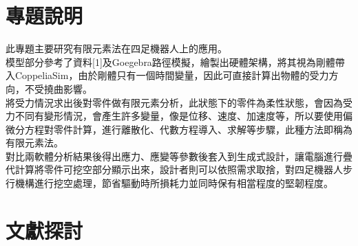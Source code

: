 \section{專題說明}
此專題主要研究有限元素法在四足機器人上的應用。\\
模型部分參考了資料[1]及Goegebra路徑模擬，繪製出硬體架構，將其視為剛體帶入CoppeliaSim，由於剛體只有一個時間變量，因此可直接計算出物體的受力方向，不受撓曲影響。\\
將受力情況求出後對零件做有限元素分析，此狀態下的零件為柔性狀態，會因為受力不同有變形情況，會產生許多變量，像是位移、速度、加速度等，所以要使用偏微分方程對零件計算，進行離散化、代數方程導入、求解等步驟，此種方法即稱為有限元素法。\\
對比兩軟體分析結果後得出應力、應變等參數後套入到生成式設計，讓電腦進行疊代計算將零件可挖空部分顯示出來，設計者則可以依照需求取捨，對四足機器人步行機構進行挖空處理，節省驅動時所損耗力並同時保有相當程度的堅韌程度。\\

\section{文獻探討}

\renewcommand{\baselinestretch}{0.5} %
